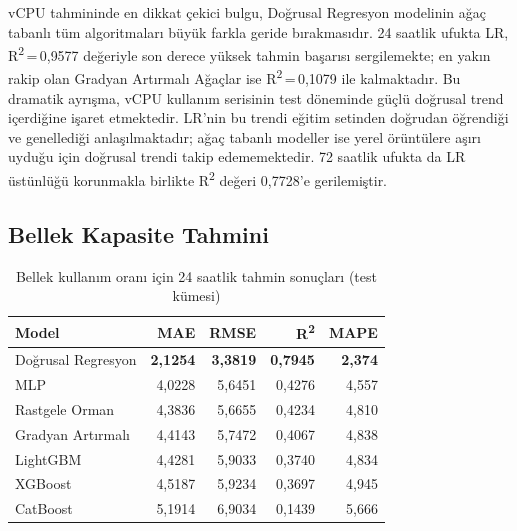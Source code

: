 vCPU tahmininde en dikkat çekici bulgu, Doğrusal Regresyon modelinin ağaç tabanlı tüm algoritmaları büyük farkla geride bırakmasıdır.
24 saatlik ufukta LR, R\textsuperscript{2}\,=\,0{,}9577 değeriyle son derece yüksek tahmin başarısı sergilemekte; en yakın rakip olan Gradyan Artırmalı Ağaçlar ise R\textsuperscript{2}\,=\,0{,}1079 ile kalmaktadır.
Bu dramatik ayrışma, vCPU kullanım serisinin test döneminde güçlü doğrusal trend içerdiğine işaret etmektedir.
LR'nin bu trendi eğitim setinden doğrudan öğrendiği ve genellediği anlaşılmaktadır; ağaç tabanlı modeller ise yerel örüntülere aşırı uyduğu için doğrusal trendi takip edememektedir.
72 saatlik ufukta da LR üstünlüğü korunmakla birlikte R\textsuperscript{2} değeri 0{,}7728'e gerilemiştir.


\subsection{Bellek Kapasite Tahmini}

\begin{table}[htbp]
    \centering
    \caption{Bellek kullanım oranı için 24 saatlik tahmin sonuçları (test kümesi)}
    \label{tab:mem24}
    \begin{tabular}{lrrrr}
        \textbf{Model} & \textbf{MAE} & \textbf{RMSE} & \textbf{R\textsuperscript{2}} & \textbf{MAPE} \\
        \hline
        Doğrusal Regresyon  & \textbf{2,1254} & \textbf{3,3819} & \textbf{0,7945} & \textbf{2,374} \\
        MLP                 & 4,0228 & 5,6451 & 0,4276 & 4,557 \\
        Rastgele Orman      & 4,3836 & 5,6655 & 0,4234 & 4,810 \\
        Gradyan Artırmalı   & 4,4143 & 5,7472 & 0,4067 & 4,838 \\
        LightGBM            & 4,4281 & 5,9033 & 0,3740 & 4,834 \\
        XGBoost             & 4,5187 & 5,9234 & 0,3697 & 4,945 \\
        CatBoost            & 5,1914 & 6,9034 & 0,1439 & 5,666 \\
    \end{tabular}
\end{table}

